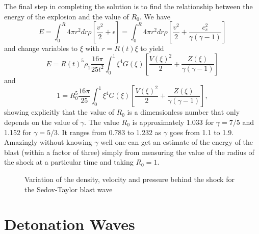The final step in completing the solution is to find the relationship
between the energy of the explosion and the value of $R_0$. We have
\begin{equation}
E = \int_0^R 4 \pi r^2 dr \rho \left [ \frac{v^2}{2} + \epsilon \right
] =\int_0^R 4 \pi r^2 dr \rho \left [ \frac{v^2}{2} +
  \frac{c_s^2}{\gamma(\gamma-1)} \right ]
\end{equation}
and change variables to $\xi$ with $r=R(t) \xi$ to yield
\begin{equation}
E = R(t)^5 \rho_1 \frac{16\pi}{25 t^2} \int_0^1 \xi^4 G(\xi) \left [
  \frac{V(\xi)^2}{2} + \frac{ Z(\xi) }{\gamma(\gamma-1)} \right ] 
\end{equation}
and
\begin{equation}
1 = R_0^5 \frac{16\pi}{25} \int_0^1 \xi^4 G(\xi) \left [
  \frac{V(\xi)^2}{2} + \frac{ Z(\xi) }{\gamma(\gamma-1)} \right ],
\end{equation}
showing explicitly that the value of $R_0$ is a dimensionless number
that only depends on the value of $\gamma$.  The value $R_0$ is
approximately 1.033 for $\gamma=7/5$ and 1.152 for $\gamma=5/3$.  It
ranges from 0.783 to 1.232 as $\gamma$ goes from 1.1 to 1.9.
Amazingly without knowing $\gamma$ well one can get an estimate of the
energy of the blast (within a factor of three) simply from measuring
the value of the radius of the shock at a particular time and taking
$R_0=1$.
\begin{figure}
\begin{center}
\end{center}
\caption{Variation of the density, velocity and pressure behind the
  shock for the Sedov-Taylor blast wave}
\label{fig:sedov}
\end{figure}

\section{Detonation Waves}
\label{sec:detonation-waves}

